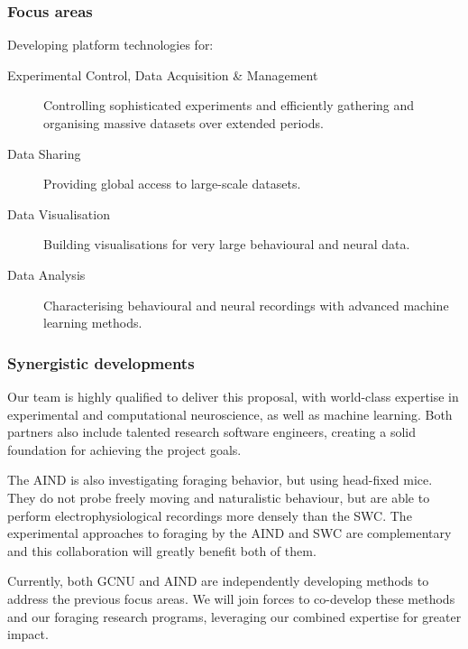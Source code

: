 
\subsubsection{Focus areas}

Developing platform technologies for:

\begin{description}

    \item[Experimental Control, Data Acquisition \& Management] Controlling
        sophisticated experiments and efficiently gathering and organising
        massive datasets over extended periods.

    \item[Data Sharing] Providing global access to large-scale datasets.

    \item[Data Visualisation] Building visualisations for very large
        behavioural and neural data.

    \item[Data Analysis] Characterising behavioural and neural recordings with
        advanced machine learning methods.

\end{description}

\subsubsection{Synergistic developments}

Our team is highly qualified to deliver this proposal, with world-class
expertise in experimental and computational neuroscience, as well as machine
learning.
%
Both partners also include talented research software engineers, creating a
solid foundation for achieving the project goals.

%

The AIND is also investigating foraging behavior, but using head-fixed mice.
They do not probe freely moving and naturalistic behaviour, but are able to
perform electrophysiological recordings more densely than the SWC.
%
The experimental approaches to foraging by the AIND and SWC are complementary
and this collaboration will greatly benefit both of them.

Currently, both GCNU and AIND are independently developing methods to address
the previous focus areas. We will join forces to co-develop these methods and
our foraging research programs, leveraging our combined expertise for greater
impact.
